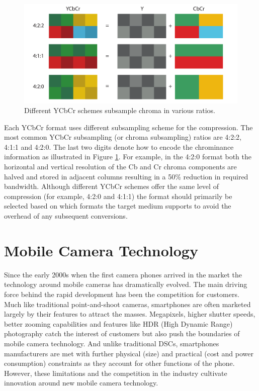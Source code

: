\documentclass[thesis.tex]{subfiles}
\begin{document}
\begin{figure}[ht]
\centering \includegraphics[width=\textwidth]{images/ycbcr}
\caption{Different YCbCr schemes subsample chroma in various ratios.\label{figure:ycbcr}}
\end{figure}

Each YCbCr format uses different subsampling scheme for the compression. The most common YCbCr subsampling (or chroma subsampling) ratios are 4:2:2, 4:1:1 and 4:2:0. The last two digits denote how to encode the chrominance information as illustrated in Figure \ref{figure:ycbcr}. For example, in the 4:2:0 format both the horizontal and vertical resolution of the Cb and Cr chroma components are halved and stored in adjacent columns resulting in a 50\% reduction in required bandwidth. Although different YCbCr schemes offer the same level of compression (for example, 4:2:0 and 4:1:1) the format should primarily be selected based on which formats the target medium supports to avoid the overhead of any subsequent conversions.

\section{Mobile Camera Technology}
Since the early 2000s when the first camera phones arrived in the market the technology around mobile cameras has dramatically evolved. The main driving force behind the rapid development has been the competition for customers. Much like traditional point-and-shoot cameras, smartphones are often marketed largely by their features to attract the masses. Megapixels, higher shutter speeds, better zooming capabilities and features like HDR (High Dynamic Range) photography catch the interest of customers but also push the boundaries of mobile camera technology. And unlike traditional DSCs, smartphones manufacturers are met with further physical (size) and practical (cost and power consumption) constraints as they account for other functions of the phone. However, these limitations and the competition in the industry cultivate innovation around new mobile camera technology.
\end{document}
